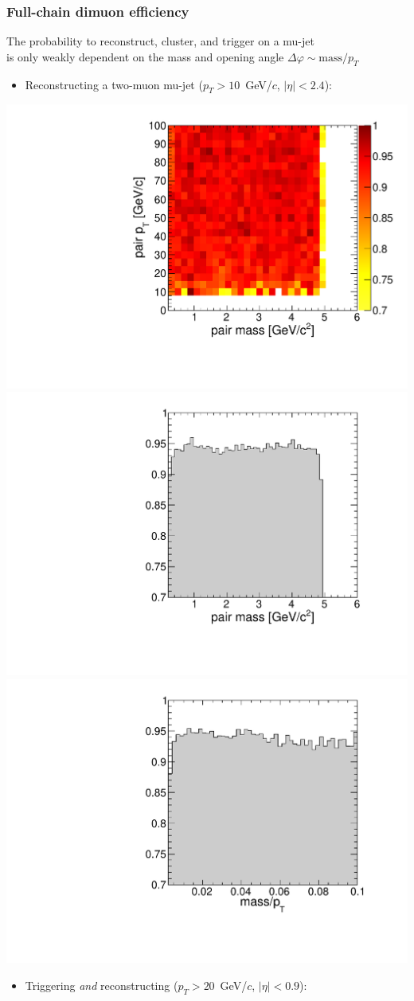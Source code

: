 \documentclass[compress]{beamer}
\begin{document}
\begin{frame}
\frametitle{Full-chain dimuon efficiency}

The probability to reconstruct, cluster, and trigger on a mu-jet \\ is
only weakly dependent on the mass and opening angle $\Delta\varphi \sim \mbox{mass}/p_T$

\begin{itemize}
\item Reconstructing a two-muon mu-jet ($p_T > 10$~GeV/$c$, $|\eta| < 2.4$):
\end{itemize}

\includegraphics[width=0.32\linewidth]{eff_mujetreco_masspt.pdf}
\includegraphics[width=0.32\linewidth]{eff_mujetreco_massonly.pdf}
\includegraphics[width=0.32\linewidth]{eff_mujetreco_oneovergamma.pdf}

\begin{itemize}
\item Triggering {\it and} reconstructing ($p_T > 20$~GeV/$c$, $|\eta| < 0.9$):
\end{itemize}


\end{frame}
\end{document}
